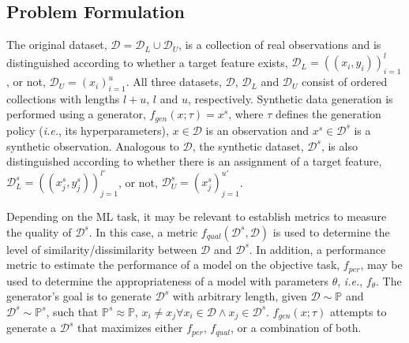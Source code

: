 
 
 

\subsection{Problem Formulation}\label{sec:problem-formulation}

The original dataset, $\mathcal{D} = \mathcal{D}_L \cup \mathcal{D}_U$,
is a collection of real observations and is distinguished according to whether
a target feature exists, $\mathcal{D}_L = {((x_i, y_i))}^l_{i=1}$, or not,
$\mathcal{D}_U = {(x_i)}^{u}_{i=1}$. All three datasets, $\mathcal{D}$,
$\mathcal{D}_L$ and $\mathcal{D}_U$ consist of ordered collections with
lengths $l+u$, $l$ and $u$, respectively. Synthetic data generation is
performed using a generator, $f_{gen}(x;\tau) = x^s$, where $\tau$
defines the generation policy (\textit{i.e.}, its hyperparameters), $x \in
\mathcal{D}$ is an observation and $x^s \in \mathcal{D}^s$ is a
synthetic observation. Analogous to $\mathcal{D}$, the synthetic dataset,
$\mathcal{D}^s$, is also distinguished according to whether there is an
assignment of a target feature, $\mathcal{D}^s_L = {((x^s_j,
y^s_j))}^{l'}_{j=1}$, or not, $\mathcal{D}^s_U =
{(x^s_j)}^{u'}_{j=1}$.

Depending on the ML task, it may be relevant to establish metrics to measure
the quality of $\mathcal{D}^s$. In this case, a metric
$f_{qual}(\mathcal{D}^s, \mathcal{D})$ is used to determine the level of
similarity/dissimilarity between $\mathcal{D}$ and $\mathcal{D}^s$. In
addition, a performance metric to estimate the performance of a model on the
objective task, $f_{per}$, may be used to determine the appropriateness of a
model with parameters $\theta$, \textit{i.e.}, $f_{\theta}$. The generator's
goal is to generate $\mathcal{D}^s$ with arbitrary length, given
$\mathcal{D} \sim \mathbb{P}$ and $\mathcal{D}^s \sim \mathbb{P}^s$, such
that $\mathbb{P}^s \approx \mathbb{P}$, $x_i \neq x_j \forall x_i \in
\mathcal{D} \wedge x_j \in \mathcal{D}^s$. $f_{gen}(x;\tau)$ attempts to
generate a $\mathcal{D}^s$ that maximizes either $f_{per}$, $f_{qual}$, or a
combination of both.
